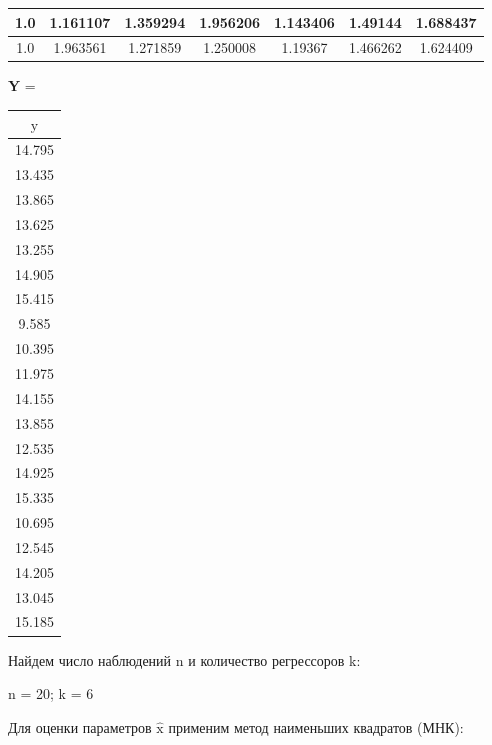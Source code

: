 \begin{center}
\begin{tabular}{ | c | c | c | c | c | c | c | }
    \hline 
    1.0 & 1.161107 & 1.359294 & 1.956206 & 1.143406 & 1.49144 & 1.688437 \\ 
    \hline 
    1.0 & 1.963561 & 1.271859 & 1.250008 & 1.19367 & 1.466262 & 1.624409 \\ 
    \hline 
    \end{tabular}
    \quad
    \textrm{\textbf{Y}} = \begin{tabular}{ | c | } 
        \hline
        $\textrm{y}$ \\
        \hline
        14.795 \\
        \hline
        13.435 \\
        \hline
        13.865 \\
        \hline
        13.625 \\ 
        \hline
        13.255 \\
        \hline
        14.905 \\
        \hline
        15.415 \\
        \hline
        9.585 \\ 
        \hline
        10.395 \\
        \hline
        11.975 \\
        \hline
        14.155 \\
        \hline
        13.855 \\
        \hline
        12.535 \\
        \hline
        14.925 \\ 
        \hline
        15.335 \\
        \hline
        10.695 \\
        \hline
        12.545 \\
        \hline
        14.205 \\
        \hline
        13.045 \\
        \hline
        15.185 \\
        \hline 
    \end{tabular}
\end{center}

Найдем число наблюдений \textrm{n} и количество регрессоров \textrm{k}: \\

\vspace{-1\baselineskip}

\begin{center}
    \textrm{n} = 20; \textrm{k} = 6
\end{center}

Для оценки параметров $\hat{\textrm{x}}$ применим метод наименьших квадратов (МНК):

